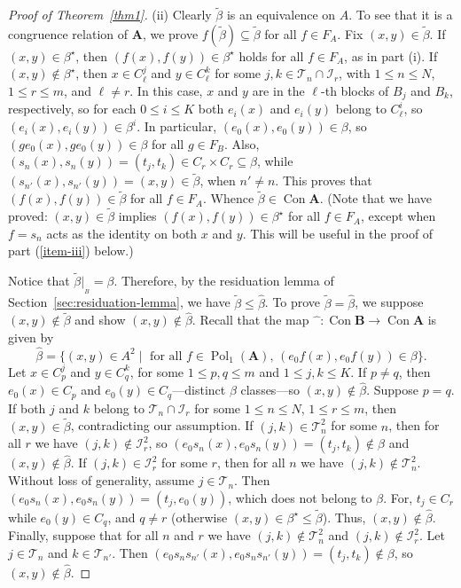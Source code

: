 \documentclass{au}
\numberwithin{equation}{section}
\theoremstyle{plain}
\theoremstyle{definition}
\newcommand{\suchthat}{\ensuremath{\mid}}  %
\newcommand{\<}{\ensuremath{\langle}}
\renewcommand{\>}{\ensuremath{\rangle}}
\newcommand{\bA}{\ensuremath{\mathbf{A}}}
\newcommand{\bB}{\ensuremath{\mathbf{B}}}
\newcommand{\sT}{\ensuremath{\mathscr{T}}}
\newcommand{\sI}{\ensuremath{\mathcal{I}}}
\DeclareMathOperator{\Con}{Con}
\DeclareMathOperator{\Pol}{Pol}
\renewcommand{\leq}{\ensuremath{\leqslant}}
\newcommand{\resB}{\ensuremath{|_{_B}}}
\newcommand{\hatmap}{\ensuremath{\widehat{\phantom{x}}}} %
\newcommand{\tbeta}{\ensuremath{\widetilde{\beta}}}
\begin{document}
\begin{proof}[Proof of Theorem~\ref{thm1}]
\smallskip %
(ii) 
Clearly $\tbeta$ is an equivalence on $A$.  To see that it
is a congruence relation of $\bA$, we prove $f(\tbeta) \subseteq \tbeta$ for
all $f\in F_A$.
Fix $(x,y)\in \tbeta$.  If
$(x,y)\in \beta^\star$, then $(f(x), f(y)) \in \beta^\star$ holds for all $f\in F_A$, as
in part (i).
If $(x,y)\notin \beta^\star$, then
$x \in C^j_{\ell}$ and
$y\in C^k_{\ell}$
for some $j, k \in \sT_n \cap \sI_r$,  with
$1\leq n \leq N$,
$1\leq r \leq m$, and $\ell\neq r$.
In this case, $x$ and $y$ are in the $\ell$-th blocks of $B_j$ and $B_k$, respectively, so
for each $0\leq i \leq K$
both $e_i(x)$ and $e_i(y)$ belong to $C_\ell^i$, so
$(e_i(x), e_i(y)) \in \beta^{i}$.
In particular, $(e_0(x), e_0(y)) \in \beta$, so
$(g e_0(x), g e_0(y)) \in \beta$ for all $g\in F_B$.
Also, $(s_n(x),s_n(y))=(t_j,t_k) \in C_r\times C_r \subseteq \beta$, while
$(s_{n'}(x),s_{n'}(y))=(x,y)\in \tbeta$, when $n'\neq n$.
This proves that $(f(x), f(y)) \in \tbeta$ for all $f\in F_A$.
Whence $\tbeta \in \Con\bA$.
(Note that we have proved: $(x,y)\in \tbeta$ implies $(f(x), f(y))\in \beta^\star$ for all $f\in F_A$,
except when $f=s_n$ acts as the identity on both $x$ and $y$.
This will be useful in the proof of part (\ref{item-iii}) below.)

Notice that $\tbeta\resB = \beta$.  Therefore, by the residuation lemma
of Section~\ref{sec:residuation-lemma}, we have $\tbeta \leq \widehat{\beta}$.
To prove $\tbeta=\widehat{\beta}$, we suppose $(x,y)\notin \tbeta$ and show
$(x,y) \notin \widehat{\beta}$.
Recall that the map $\hatmap\colon  \Con\bB \rightarrow \Con\bA$ is given by
\[
\widehat{\beta} = \{(x,y) \in A^2 \suchthat \text{ for all }
f\in \Pol_1(\bA), \, (e_0f(x), e_0f(y))\in \beta \}.
\]
Let
$x \in C_p^j$ and
$y\in C^k_q$, for some $1\leq p, q
\leq m$ and $1\leq j, k \leq K$.  If $p\neq q$, then
$e_0(x) \in C_p$ and $e_0(y)\in C_q$---distinct $\beta$ classes---so
$(x,y) \notin \widehat{\beta}$.
Suppose $p=q$.  If both $j$ and $k$ belong to $\sT_n\cap \sI_r$ for some
$1\leq n \leq N$, $1\leq r\leq m$, then $(x,y)\in \tbeta$, contradicting our
assumption.
If $(j,k) \in \sT_n^2$ for some $n$, then for all $r$ we have $(j,k) \notin \sI_r^2$, so
$(e_0s_n(x), e_0s_n(y)) = (t_j, t_k) \notin \beta$ and
 $(x,y) \notin \widehat{\beta}$.
If $(j,k) \in \sI_r^2$ for some $r$, then for all $n$ we have $(j,k) \notin
\sT_n^2$.  Without loss of generality, assume $j \in \sT_n$. Then
$(e_0s_n(x), e_0s_n(y)) = (t_j, e_0(y))$, which does not belong to $\beta$.
For, $t_j\in C_r$ while $e_0(y) \in C_q$, and $q\neq r$ (otherwise $(x,y)\in \beta^\star \leq \tbeta$).
Thus, $(x,y) \notin \widehat{\beta}$.  Finally, suppose that for all $n$
and $r$ we have $(j,k) \notin \sT_n^2$ and $(j,k) \notin \sI_r^2$.
Let $j\in \sT_n$ and $k\in \sT_{n'}$. Then
$(e_0 s_n s_{n'}(x), e_0s_n s_{n'} (y)) = (t_j, t_k)\notin \beta$,
so $(x,y) \notin \widehat{\beta}$.


\end{proof}
\end{document}
